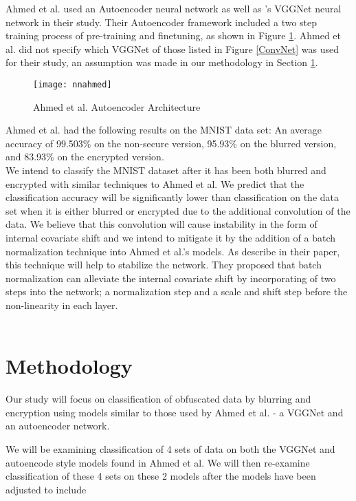 \documentclass[12pt, titlepage]{article}
\begin{document}
\noindent Ahmed et al. used an Autoencoder neural network as well as \cite{simonyan2014very}'s VGGNet neural network in their study. Their Autoencoder framework included a two step training process of pre-training and finetuning, as shown in Figure \ref{nnahmed}. Ahmed et al. did not specify which VGGNet of those listed in Figure \ref{ConvNet} was used for their study, an assumption was made in our methodology in Section \ref{Methodology}.\\

\begin{figure}[h!]
	\begin{center}
		\texttt{[image: nnahmed]}
		\caption{Ahmed et al. Autoencoder Architecture}
		\label{nnahmed}
	\end{center}
\end{figure}

\noindent Ahmed et al. had the following results on the MNIST data set: An average accuracy of 99.503\% on the non-secure version, 95.93\% on the blurred version, and 83.93\% on the encrypted version.\\

\noindent We intend to classify the MNIST dataset after it has been both blurred and encrypted with similar techniques to Ahmed et al. We predict that the classification accuracy will be significantly lower than classification on the data set when it is either blurred or encrypted due to the additional convolution of the data. We believe that this convolution will cause instability in the form of internal covariate shift and we intend to mitigate it by the addition of a batch normalization technique into Ahmed et al.'s models. As \cite{ioffe2015batch} describe in their paper, this technique will help to stabilize the network. They proposed that batch normalization can alleviate the internal covariate shift by incorporating of two steps into the network; a normalization step and a scale and shift step before the non-linearity in each layer.\\

~\newpage
\section{Methodology}\label{Methodology}

Our study will focus on classification of obfuscated data by blurring and encryption using models similar to those used by Ahmed et al. - a VGGNet and an autoencoder network.

We will be examining classification of 4 sets of data on both the VGGNet and autoencode style models found in Ahmed et al. We will then re-examine classification of these 4 sets on these 2 models after the models have been adjusted to include 
\end{document}
